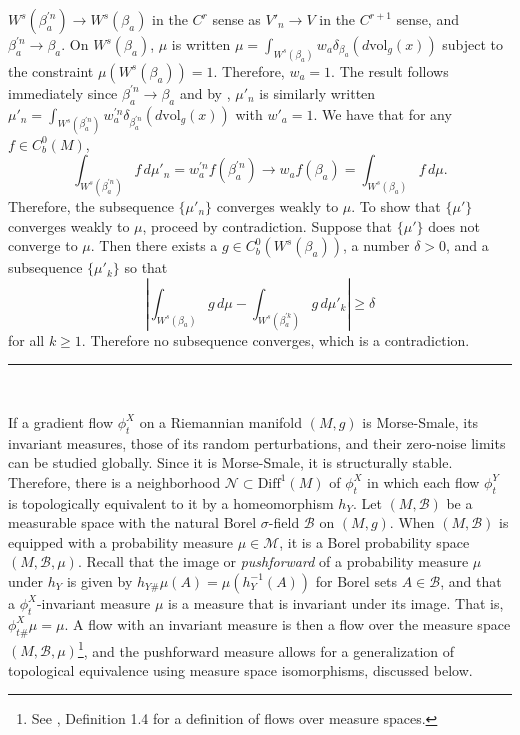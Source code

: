 \documentclass[12pt]{article}
\newcommand{\BlackBox}{\rule{1.5ex}{1.5ex}}  %
\renewenvironment{proof}{\par\noindent{\bf Proof\ }}{\hfill\BlackBox\\[2mm]}
\newenvironment{proof}{\par\noindent{\bf Proof\ }}{\hfill\BlackBox\\[2mm]}
\begin{document}
\begin{proof}
    $W^s(\beta_a^{'n}) \rightarrow W^s(\beta_a)$ in the $C^r$ sense as $V'_n \rightarrow V$ in the $C^{r+1}$ sense, and $\beta_a^{'n} \rightarrow \beta_a$. On $W^s(\beta_a)$, $\mu$ is written $\mu = \int_{W^s(\beta_a)} w_a \delta_{\beta_{a}} \left(d\text{vol}_g(x)\right)$ subject to the constraint $\mu(W^s(\beta_a))=1$. Therefore, $w_a=1$. The result follows immediately since $\beta_a^{'n} \rightarrow \beta_a$ and by , $\mu'_n$ is similarly written $\mu'_n = \int_{W^s(\beta^{'n}_a)} w^{'n}_a \delta_{\beta^{'n}_{a}} \left(d\text{vol}_g(x)\right)$ with $w'_a=1$. We have that for any $f \in C^0_b(M)$,
    \begin{equation*}
        \int_{W^s(\beta_a^{'n})} f \,d\mu'_{n} = w_a^{'n} f(\beta_a^{'n}) \rightarrow w_a f(\beta_a) = \int_{W^s(\beta_a)} f \,d\mu.
    \end{equation*}
    Therefore, the subsequence $\{\mu'_{n}\}$ converges weakly to $\mu$. To show that $\{\mu'\}$ converges weakly to $\mu$, proceed by contradiction. Suppose that $\{\mu'\}$ does not converge to $\mu$. Then there exists a $g\in C^0_b(W^s(\beta_a))$, a number $\delta > 0$, and a subsequence $\{\mu'_{k}\}$ so that 
    \begin{equation*}
        \left|\int_{W^s(\beta_a)} g \,d\mu - \int_{W^s(\beta_a^{'k})} g \,d\mu'_{k} \right| \geq \delta
    \end{equation*}
    for all $k \geq 1$. Therefore no subsequence converges, which is a contradiction.
\end{proof}

If a gradient flow $\phi_t^X$ on a Riemannian manifold $(M,g)$ is Morse-Smale, its invariant measures, those of its random perturbations, and their zero-noise limits can be studied globally. Since it is Morse-Smale, it is structurally stable. Therefore, there is a neighborhood $\mathcal{N} \subset \text{Diff}^1(M)$ of $\phi_t^X$ in which each flow $\phi_t^Y$ is topologically equivalent to it by a homeomorphism $h_Y$. Let $(M,\mathcal{B})$ be a measurable space with the natural Borel $\sigma$-field $\mathcal{B}$ on $(M,g)$. When $(M,\mathcal{B})$ is equipped with a probability measure $\mu \in \mathcal{M}$, it is a Borel probability space $(M,\mathcal{B},\mu)$. Recall that the image or \textit{pushforward} of a probability measure $\mu$ under $h_Y$ is given by $h_{Y\#}\mu(A) = \mu(h_Y^{-1}(A))$ for Borel sets $A\in \mathcal{B}$, and that a $\phi_t^X$-invariant measure $\mu$ is a measure that is invariant under its image. That is, $\phi_{t{\#}}^X \mu = \mu$. A flow with an invariant measure is then a flow over the measure space $(M, \mathcal{B}, \mu)$\footnote{See \cite{sinai1989dynamical}, Definition 1.4 for a definition of flows over measure spaces.}, and the pushforward measure allows for a generalization of topological equivalence using measure space isomorphisms, discussed below.
\end{document}
